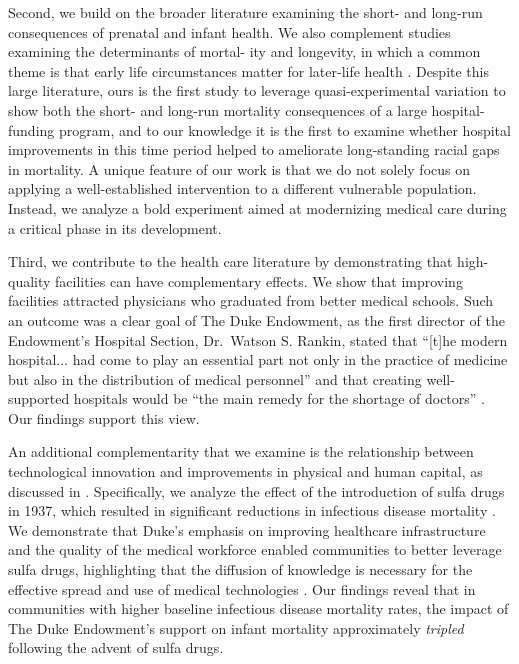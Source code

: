 \documentclass[12pt]{article}
\begin{document}
Second, we build on the broader literature examining the short- and long-run consequences of prenatal and infant health. 
We also complement studies examining the determinants of mortal- ity and longevity, in which a common theme is that early life circumstances matter for later-life health . 
Despite this large literature, ours is the first study to leverage quasi-experimental variation to show both the short- and long-run mortality consequences of a large hospital-funding program, and to our knowledge it is the first to examine whether hospital improvements in this time period helped to ameliorate long-standing racial gaps in mortality. 
A unique feature of our work is that we do not solely focus on applying a well-established intervention to a different vulnerable population. Instead, we analyze a bold experiment aimed at modernizing medical care during a critical phase in its development. 

Third, we contribute to the health care literature by demonstrating that high-quality facilities can have complementary effects.  We show that improving facilities attracted physicians who graduated from better medical schools. 
Such an outcome was a clear goal of The Duke Endowment, as the first director of the Endowment's Hospital Section, Dr.\ Watson S. Rankin, stated that  ``[t]he modern hospital$\ldots$ had come to play an essential part not only in the practice of medicine but also in the distribution of medical personnel'' and that creating well-supported hospitals would be ``the main remedy for the shortage of doctors'' . 
Our findings support this view. 

An additional complementarity that we examine is the relationship between technological innovation and improvements in physical and human capital, as discussed in .
Specifically, we analyze the effect of the introduction of sulfa drugs in 1937, which resulted in significant reductions in infectious disease mortality . 
We demonstrate that Duke's emphasis on improving healthcare infrastructure and the quality of the medical workforce enabled communities to better leverage sulfa drugs, highlighting that the diffusion of knowledge is necessary for the effective spread and use of medical technologies . 
Our findings reveal that in communities with higher baseline infectious disease mortality rates, the impact of The Duke Endowment's support on infant mortality approximately \emph{tripled} following the advent of sulfa drugs.
\end{document}
